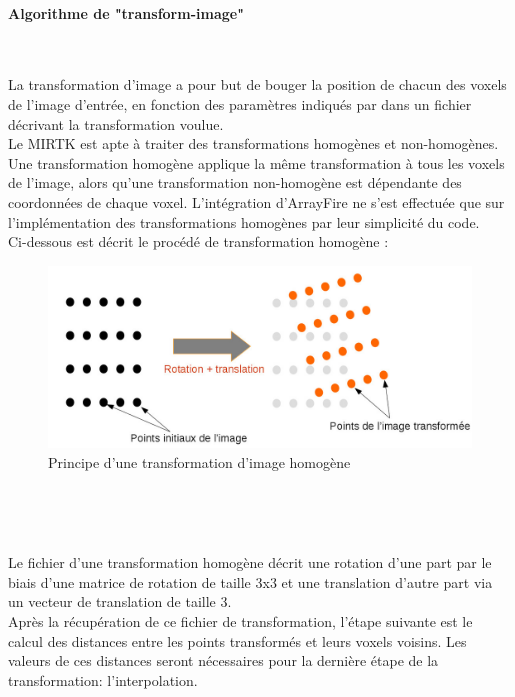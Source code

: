 \documentclass[10pt]{report}
\begin{document}
	\paragraph{Algorithme de "transform-image"} ~\par
	La transformation d'image a pour but de bouger la position de chacun des voxels de l'image d'entrée, en fonction des paramètres indiqués par dans un fichier décrivant la transformation voulue.\\
	Le MIRTK est apte à traiter des transformations homogènes et non-homogènes. Une transformation homogène applique la même transformation à tous les voxels de l'image, alors qu'une transformation non-homogène est dépendante des coordonnées de chaque voxel. L'intégration d'ArrayFire ne s'est effectuée que sur l'implémentation des transformations homogènes par leur simplicité du code. \\
	Ci-dessous est décrit le procédé de transformation homogène :
	\begin{figure}[h!]
		\begin{center}
			\includegraphics[width=14cm]{transform_trans_rot.jpg}
		\end{center}
		\caption{Principe d'une transformation d'image homogène}
		\label{Principe d'une transformation d'image homogène}
	\end{figure} ~\par
~\par
	Le fichier d'une transformation homogène décrit une rotation d'une part par le biais d'une matrice de rotation de taille 3x3 et une translation d'autre part via un vecteur de translation de taille 3.\\
	Après la récupération de ce fichier de transformation, l'étape suivante est le calcul des distances entre les points transformés et leurs voxels voisins. Les valeurs de ces distances seront nécessaires pour la dernière étape de la transformation: l'interpolation.
	
\end{document}
